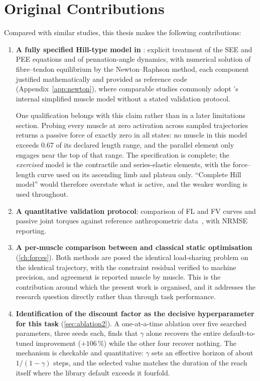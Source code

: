 \section{Original Contributions}
\label{sec:contributions}

Compared with similar studies, this thesis makes the following contributions:

\begin{enumerate}[label=\textbf{C\arabic*.}, leftmargin=2.2em]
  \item \textbf{A fully specified Hill-type model in \MuJoCo{}}: explicit
        treatment of the SEE and PEE equations and of pennation-angle dynamics,
        with numerical solution of fibre--tendon equilibrium by the
        Newton--Raphson method, each component justified mathematically and
        provided as reference code (Appendix~\ref{app:newton}), where comparable
        studies commonly adopt \MuJoCo{}'s internal simplified muscle model
        without a stated validation protocol.

        One qualification belongs with this claim rather than in a later
        limitations section. Probing every muscle at zero activation across
        sampled trajectories returns a passive force of exactly zero in all
        states: no muscle in this model exceeds $0.67$ of its declared length
        range, and the parallel element only engages near the top of that range.
        The specification is complete; the \emph{exercised} model is the
        contractile and series-elastic elements, with the force--length curve
        used on its ascending limb and plateau only. ``Complete Hill model''
        would therefore overstate what is active, and the weaker wording is used
        throughout.
  \item \textbf{A quantitative validation protocol}: comparison of FL and FV
        curves and passive joint torques against reference anthropometric
        data~\parencite{Holzbaur2005, Gordon1966}, with NRMSE reporting.
  \item \textbf{A per-muscle comparison between \DRL{} and classical static
        optimisation} (\cref{ch:forces}). Both methods are posed the identical
        load-sharing problem on the identical trajectory, with the constraint
        residual verified to machine precision, and agreement is reported muscle
        by muscle. This is the contribution around which the present work is
        organised, and it addresses the research question directly rather than
        through task performance.
  \item \textbf{Identification of the discount factor as the decisive
        hyperparameter for this task} (\cref{sec:ablation2}). A one-at-a-time
        ablation over five searched parameters, three seeds each, finds that
        $\gamma$ alone recovers the entire default-to-tuned improvement
        ($+106$\,\%) while the other four recover nothing. The mechanism is
        checkable and quantitative: $\gamma$ sets an effective horizon of about
        $1/(1-\gamma)$ steps, and the selected value matches the duration of the
        reach itself where the library default exceeds it fourfold.


\end{enumerate}
